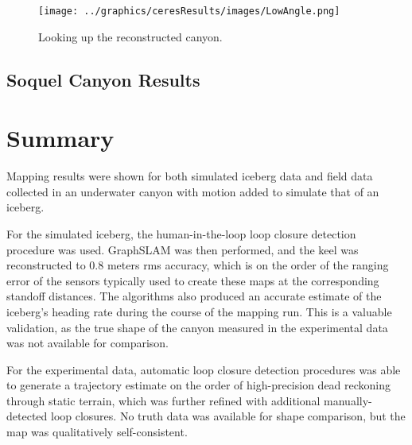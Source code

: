  \begin{figure}[!htb]
   \centering
   \texttt{[image: ../graphics/ceresResults/images/LowAngle.png]} %
   \caption{Looking up the reconstructed canyon.}
   \label{fig:RealDataSolution5}
\end{figure}
\subsection{Soquel Canyon Results}


\section{Summary}

Mapping results were shown for both simulated iceberg data and field data collected in an underwater canyon with motion added to simulate that of an iceberg. 

For the simulated iceberg, the human-in-the-loop loop closure detection procedure was used. GraphSLAM was then performed, and the keel was reconstructed to 0.8 meters rms accuracy, which is on the order of the ranging error of the sensors typically used to create these maps at the corresponding standoff distances. The algorithms also produced an accurate estimate of the iceberg's heading rate during the course of the mapping run. This is a valuable validation, as the true shape of the canyon measured in the experimental data was not available for comparison.

For the experimental data, automatic loop closure detection procedures was able to generate a trajectory estimate on the order of high-precision dead reckoning through static terrain, which was further refined with additional manually-detected loop closures.  No truth data was available for shape comparison, but the map was qualitatively self-consistent. 


